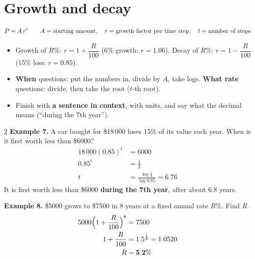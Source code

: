 \documentclass[11pt]{article}
\begin{document}
\section{Growth and decay}\label{h2:growth}
\[ P = A\,r^{t} \qquad A = \text{starting amount},\quad r = \text{growth factor{} per time step},\quad t = \text{number of steps} \]
\begin{itemize}
\item Growth of $R\%$: $r = 1 + \dfrac{R}{100}$ (6\% growth: $r = 1.06$). Decay of $R\%$: $r = 1 - \dfrac{R}{100}$ (15\% loss: $r = 0.85$).
\item \textbf{When} questions: put the numbers in, divide by $A$, take logs. \textbf{What rate} questions: divide, then take the root ($t$-th root).
\item Finish with \textbf{a sentence in context}, with units, and say what the decimal means (``during the 7th year'').
\end{itemize}

\begin{multicols}{2}
\textbf{Example 7.} A car bought for \$18\,000 loses 15\% of its value each year. When is it first worth less than \$6000?
\begin{align*}
18\,000(0.85)^{t} &= 6000\\
0.85^{t} &= \tfrac{1}{3}\\
t &= \frac{\log\frac{1}{3}}{\log 0.85} = 6.76
\end{align*}
It is first worth less than \$6000 \textbf{during the 7th year}, after about 6.8 years.
\columnbreak

\textbf{Example 8.} \$5000 grows to \$7500 in 8 years at a fixed annual rate $R\%$. Find $R$.
\begin{align*}
5000\Bigl(1 + \frac{R}{100}\Bigr)^{8} &= 7500\\
1 + \frac{R}{100} &= 1.5^{\frac{1}{8}} = 1.0520\\
R &= \mathbf{5.2\%}
\end{align*}
\end{multicols}

\end{document}
